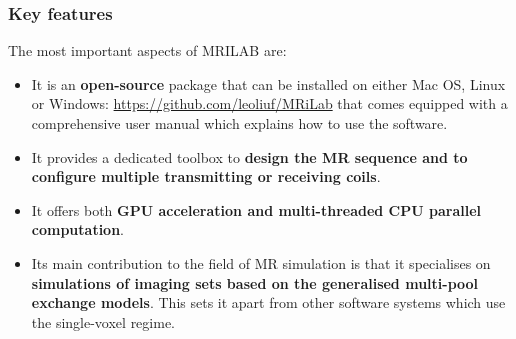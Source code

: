 \hfill
    
\subsubsection{Key features}
The most important aspects of MRILAB are:
\begin{itemize}

    \item It is an \textbf{open-source} package that can be installed on either Mac OS, Linux or Windows: \url{https://github.com/leoliuf/MRiLab} that comes equipped with a comprehensive user manual which explains how to use the software.
    
    \item It provides a dedicated toolbox 
    to \textbf{design the MR sequence and to configure multiple transmitting or receiving coils}.
    
    \item It offers both \textbf{GPU acceleration and multi-threaded CPU parallel computation}.
    
    
    \item Its main contribution to the field of MR simulation is that it specialises on \textbf{simulations of imaging sets based on the generalised multi-pool exchange models}.
    This sets it apart from other software systems which use the single-voxel regime.
    
\end{itemize}

\hfill

